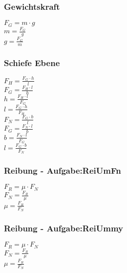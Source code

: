 \subsubsection{Gewichtskraft} 
\begin{minipage}{0.45\textwidth} 
$ F_{G}  = m\cdot g $\\ 
$ m = \frac{F_{G} }{g} $\\ 
$ g = \frac{F_{G} }{m} $\\ 
\end{minipage} 
\begin{minipage}{0.45\textwidth} 
 
\end{minipage} 
\subsubsection{Schiefe Ebene} 
\begin{minipage}{0.45\textwidth} 
$ F_{H}  = \frac{F_{G} \cdot h}{ l} $\\ 
$ F_{G}  = \frac{F_{H} \cdot l}{ h} $\\ 
$ h = \frac{F_{H} \cdot l}{ F_{G} } $\\ 
$ l = \frac{F_{G} \cdot h}{ F_{H} } $\\ 
$ F_{N}  = \frac{F_{G} \cdot b}{ l} $\\ 
$ F_{G}  = \frac{F_{N} \cdot l}{ b} $\\ 
$ b = \frac{F_{N} \cdot l}{ F_{G} } $\\ 
$ l = \frac{F_{G} \cdot b}{ F_{N} } $\\ 
\end{minipage} 
\begin{minipage}{0.45\textwidth} 
 
\end{minipage} 
\subsubsection{Reibung - Aufgabe:ReiUmFn} 
\begin{minipage}{0.45\textwidth} 
$ F_{R}  = \mu \cdot F_{N} $\\ 
$ F_{N}  = \frac{F_{R} }{\mu } $\\ 
$ \mu  = \frac{F_{R} }{F_{N} } $\\ 
\end{minipage} 
\begin{minipage}{0.45\textwidth} 
 
\end{minipage} 
\subsubsection{Reibung - Aufgabe:ReiUmmy} 
\begin{minipage}{0.45\textwidth} 
$ F_{R}  = \mu \cdot F_{N} $\\ 
$ F_{N}  = \frac{F_{R} }{\mu } $\\ 
$ \mu  = \frac{F_{R} }{F_{N} } $\\ 
\end{minipage} 
\begin{minipage}{0.45\textwidth} 
 
\end{minipage} 
